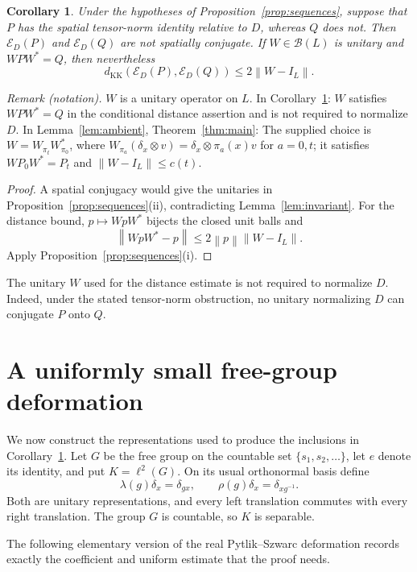 \documentclass[11pt]{article}
\newtheorem{corollary}[theorem]{Corollary}
\theoremstyle{definition}
\theoremstyle{remark}
\newcommand{\B}{\mathcal B}
\newcommand{\E}{\mathcal E}
\newcommand{\KK}{d_{\mathrm{KK}}}
\newcommand{\id}{I}
\newcommand{\norm}[1]{\left\|#1\right\|}
\begin{document}
\begin{corollary}\label{cor:obstruction}
Under the hypotheses of Proposition~\ref{prop:sequences}, suppose that
$P$ has the spatial tensor-norm identity relative to $D$, whereas $Q$
does not. Then $\E_D(P)$ and $\E_D(Q)$ are not spatially conjugate.
If $W\in\B(L)$ is unitary and $WPW^*=Q$, then nevertheless
\[
\KK(\E_D(P),\E_D(Q))\le2\norm{W-\id_L}.
\]
\end{corollary}

\noindent\textit{Remark (notation).} $W$ is a unitary operator on $L$. In Corollary~\ref{cor:obstruction}: $W$ satisfies $WPW^*=Q$ in the conditional distance assertion and is not required to normalize $D$. In Lemma~\ref{lem:ambient}, Theorem~\ref{thm:main}: The supplied choice is $W=W_{\pi_t}W_{\pi_0}^*$, where $W_{\pi_a}(\delta_x\otimes v)=\delta_x\otimes\pi_a(x)v$ for $a=0,t$; it satisfies $WP_0W^*=P_t$ and $\norm{W-\id_L}\le c(t)$.


\begin{proof}
A spatial conjugacy would give the unitaries in
Proposition~\ref{prop:sequences}(ii), contradicting
Lemma~\ref{lem:invariant}. For the distance bound,
$p\mapsto WpW^*$ bijects the closed unit balls and
\[
\norm{WpW^*-p}\le2\norm{p}\norm{W-\id_L}.
\]
Apply Proposition~\ref{prop:sequences}(i).
\end{proof}

The unitary $W$ used for the distance estimate is not required to normalize $D$.
Indeed, under the stated tensor-norm obstruction, no unitary normalizing
$D$ can conjugate $P$ onto $Q$.

\section{A uniformly small free-group deformation}\label{sec:tree}

We now construct the representations used to produce the inclusions in
Corollary~\ref{cor:obstruction}. Let $G$ be the free group on the countable
set $\{s_1,s_2,\ldots\}$, let $e$ denote its identity, and put
$K=\ell^2(G)$. On its usual orthonormal basis define
\begin{equation}\label{eq:regular}
\lambda(g)\delta_x=\delta_{gx},\qquad
\rho(g)\delta_x=\delta_{xg^{-1}}.
\end{equation}
Both are unitary representations, and every left translation commutes
with every right translation. The group $G$ is countable, so $K$ is
separable.

The following elementary version of the real Pytlik--Szwarc deformation
\cite{PS86,BOT13} records exactly the coefficient and uniform estimate
that the proof needs.
\end{document}
